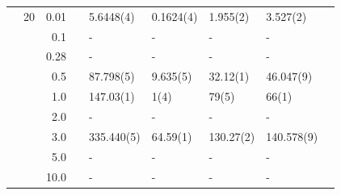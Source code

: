 \begin{table}
\begin{tabularx}{\textwidth}{R{1cm}rrcR{2.3cm}R{2.3cm}R{2.3cm}R{2.3cm}R{1cm}}
		&20 & 0.01 && 5.6448(4) & 0.1624(4) & 1.955(2) & 3.527(2) \\
		&& 0.1 && - & - & - & - \\
		&& 0.28 && - & - & - & - \\
		&& 0.5 && 87.798(5) & 9.635(5) & 32.12(1) & 46.047(9) \\
		&& 1.0 && 147.03(1) & 1(4) & 79(5) & 66(1) \\
		&& 2.0 && - & - & - & -\\
		&& 3.0 && 335.440(5) & 64.59(1) & 130.27(2) & 140.578(9) \\ 
		&& 5.0 && - & - & - & -\\
		&& 10.0 && - & - & - & -\\
		\hline \hline
	\end{tabularx}
\end{table}

